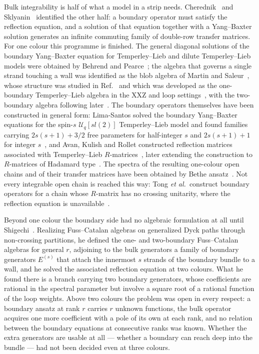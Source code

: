 \documentclass[
  aps,pre,
  reprint,
  superscriptaddress,
  amsmath,amssymb,
  floatfix
]{revtex4-2}
\theoremstyle{plain}
\theoremstyle{definition}
\theoremstyle{remark}
\begin{document}
Bulk integrability is half of what a model in a strip needs.
Cherednik~\cite{cherednik1984factorizing} and Sklyanin~\cite{sklyanin1988boundary}
identified the other half: a boundary operator must satisfy the reflection
equation, and a solution of that equation together with a Yang--Baxter solution
generates an infinite commuting family of double-row transfer matrices. For one
colour this programme is finished. The general diagonal solutions of the boundary
Yang--Baxter equation for Temperley--Lieb and dilute Temperley--Lieb models
were obtained by Behrend and Pearce~\cite{behrend1997boundary}; the algebra that governs a single strand
touching a wall was identified as the blob algebra of Martin and
Saleur~\cite{martin1994blob}, whose structure was studied in Ref.~\cite{Martin_2000ot} and which was developed as the one-boundary
Temperley--Lieb algebra in the XXZ and loop settings~\cite{nichols2005one},
with the two-boundary algebra following later~\cite{de2009two}. The boundary operators themselves have been constructed in general
form: Lima-Santos solved the boundary
Yang--Baxter equations for the spin-$s$ $\mathcal{U}_q[sl(2)]$
Temperley--Lieb model and found families carrying $2s(s+1)+3/2$ free parameters
for half-integer $s$ and $2s(s+1)+1$ for integer $s$~\cite{limasantos2011mathcal},
and Avan, Kulish and Rollet constructed reflection matrices associated with
Temperley--Lieb $R$-matrices~\cite{avan2011reflection}, later extending the
construction to $R$-matrices of Hadamard type~\cite{Avan_2014rm}. The spectra of the
resulting one-colour open chains and of their transfer matrices have been
obtained by Bethe ansatz~\cite{Gier_2004ba,Ribeiro_2013ba,Nepomechie_2016ub}. Not every integrable
open chain is reached this way: Tong \textit{et al.}\ construct boundary
operators for a chain whose $R$-matrix has no crossing unitarity, where the
reflection equation is unavailable~\cite{tong2021shor}.

Beyond one colour the boundary side had no algebraic formulation at all until
Shigechi~\cite{shigechi2025fuss}. Realizing Fuss--Catalan algebras on
generalized Dyck paths through non-crossing partitions, he defined the one- and
two-boundary Fuss--Catalan algebras for general $r$, adjoining to the bulk
generators a family of boundary generators $E^{(s)}$ that attach the innermost
$s$ strands of the boundary bundle to a wall, and he solved the associated
reflection equation at two colours. What he found there is a branch carrying
two boundary generators, whose coefficients are rational in the spectral
parameter but involve a square root of a rational function of the loop weights.
Above two colours the problem was open in every respect: a boundary ansatz at
rank $r$ carries $r$ unknown functions, the bulk operator acquires one more
coefficient with a pole of its own at each rank, and no relation between the
boundary equations at consecutive ranks was known. Whether the extra
generators are usable at all --- whether a boundary can reach deep into the
bundle --- had not been decided even at three colours.
\end{document}

